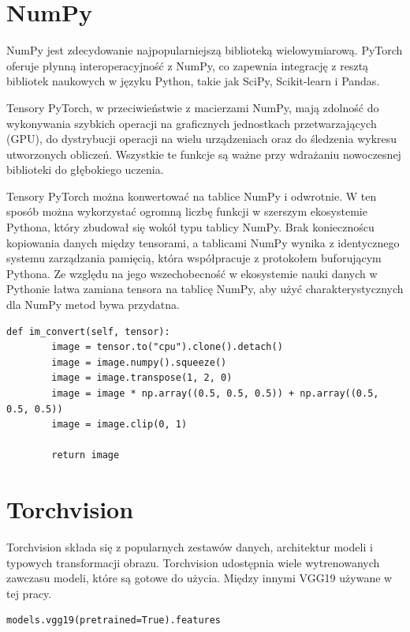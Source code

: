 \documentclass[brudnopis]{xmgr}
\begin{document}
\section{NumPy\label{s:dsssl}}
    
    NumPy jest zdecydowanie najpopularniejszą biblioteką wielowymiarową. PyTorch oferuje płynną interoperacyjność z NumPy, co zapewnia integrację z resztą bibliotek naukowych w języku Python, takie jak SciPy, Scikit-learn i Pandas.
    

Tensory PyTorch, w przeciwieństwie z macierzami NumPy, mają zdolność do wykonywania szybkich operacji na graficznych jednostkach przetwarzających (GPU), do dystrybucji operacji na wielu urządzeniach oraz do śledzenia wykresu utworzonych obliczeń. Wszystkie te funkcje są ważne przy wdrażaniu nowoczesnej biblioteki do głębokiego uczenia.


Tensory PyTorch można konwertować na tablice NumPy i odwrotnie. W ten sposób można wykorzystać ogromną liczbę funkcji w szerszym ekosystemie Pythona, który zbudował się wokół typu tablicy NumPy. Brak koniecznoścu kopiowania danych między tensorami, a tablicami NumPy wynika z identycznego systemu zarządzania pamięcią, która współpracuje z protokołem buforującym Pythona. 
Ze względu na jego wszechobecność w ekosystemie nauki danych w Pythonie łatwa zamiana tensora na tablicę NumPy, aby użyć charakterystycznych dla NumPy metod bywa przydatna.

\begin{lstlisting}
def im_convert(self, tensor):
        image = tensor.to("cpu").clone().detach()
        image = image.numpy().squeeze()
        image = image.transpose(1, 2, 0)
        image = image * np.array((0.5, 0.5, 0.5)) + np.array((0.5, 0.5, 0.5))
        image = image.clip(0, 1)

        return image
\end{lstlisting}

    \section{Torchvision\label{s:dsssl}}
    
    Torchvision składa się z popularnych zestawów danych, architektur modeli i typowych transformacji obrazu. Torchvision udostępnia wiele wytrenowanych zawczasu modeli, które są gotowe do użycia. Między innymi VGG19 używane w tej pracy.
    
\begin{lstlisting}
models.vgg19(pretrained=True).features
\end{lstlisting}
\end{document}
